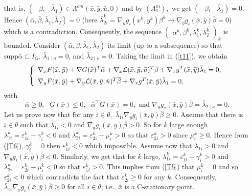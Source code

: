 	that is, $(-\beta,-\bar{\lambda}_{1})\in\Lambda^{em}(\bar{x},\bar{y},\bar
	{u},0)$ and by $(A_{1}^{m}),$ we get $(-\beta,-\bar{\lambda}
	_{1})=0.$ Hence $(\bar{\alpha},\bar{\beta},\bar{\lambda}_{1},\bar{\lambda}
	_{2})=0$ (here $\bar{\lambda}_{2i}^{k}=\nabla_{y}g_{i}(x^{k},y^{k})\beta
	^{k}\rightarrow\nabla_{y}g_{i}(\bar{x},\bar{y})\bar{\beta}=0$) which is a contradiction. 	Consequently, the sequence $
	\begin{pmatrix}
	\alpha^{k},\beta^{k},\lambda_{1}^{k},\lambda_{2}^{k}
	\end{pmatrix}
	_{k}$ is bounded. Consider $(\bar{\alpha},\overline{\beta},\bar{\lambda}
	_{1},\bar{\lambda}_{2})$ its limit (up to a subsequence) so that
$\mathrm{supp}\bar{\alpha}\subset I_{G}$, $\bar{\lambda}_{1\mid\eta
	}=0$, and $\bar{\lambda}_{2\mid\nu}=0$. 
	Taking the limit in (\ref{t11}), we obtain
	\[
	\left\{
	\begin{array}
	[c]{l}
	\nabla_{x}F(\bar{x},\bar{y})+\nabla G(\bar{x})^{T}\bar{\alpha}+\nabla
	_{x}\mathcal{L}(\bar{x},\bar{y},\bar{u})^{T}\overline{\beta}+\nabla_{x}
	g^{T}(\bar{x},\bar{y})\bar{\lambda}_{1}=0,\\[1ex]
	\nabla_{y}F(\bar{x},\bar{y})+\nabla_{y}\mathcal{L}(\bar{x},\bar{y},\bar
	{u})^{T}\overline{\beta}+\nabla_{x}g^{T}(\bar{x},\bar{y})\bar{\lambda}_{1}=0,
	\end{array}
	\right.
	\]
	with
	\[
	\bar{\alpha}\geq0,\text{ \ }G(\bar{x})\leq0,\text{  }\bar{\alpha}^{\top}
	G(\bar{x})=0, \text{ \ and  }\nabla_{y}g_{\nu}(\bar{x},\bar{y})\overline{\beta
	}=\bar{\lambda}_{2\mid\nu}=0.
	\]
	Let us prove now that for any $i\in\theta,$ $\bar{\lambda}_{1i}\nabla_{y}
	g_{i}(\bar{x},\bar{y})\overline{\beta}\geq0.$ Assume that there is $i\in
	\theta$ such that $\bar{\lambda}_{1i}<0$ and $\nabla_{y}g_{i}(\bar{x},\bar
	{y})\overline{\beta}>0.$ So for $k$ large enough  $\lambda_{1i}^{k}
	=\varepsilon_{1i}^{k}-\gamma_{i}^{k}<0$ and $\lambda_{2i}^{k}=\varepsilon
	_{2i}^{k}-\mu_{i}^{k}>0$ so that $\varepsilon_{2i}^{k}>0$ since $\mu_{i}
	^{k}\geq0.$ Hence from (\ref{T6}), $\gamma_{i}^{k}=0$ then $\varepsilon
	_{1i}^{k}<0$ which impossible. Assume now that $\bar{\lambda}_{1i}>0$ and
	$\nabla_{y}g_{i}(\bar{x},\bar{y})\overline{\beta}<0.$ Similarly, we get that
	for $k$ large, $\lambda_{1i}^{k}=\varepsilon_{1i}^{k}-\gamma_{i}^{k}>0$ and
	$\lambda_{2i}^{k}=\varepsilon_{2i}^{k}-\mu_{i}^{k}<0$ so that $\varepsilon
	_{1i}^{k}>0.$ This implies from (\ref{T5}) that $\mu_{i}^{k}=0$ and so
	$\varepsilon_{2i}^{k}<0$ which contradicts the fact that $\varepsilon_{2i}
	^{k}\geq0$ for any $k.$ Consequently,
	$\bar{\lambda}_{1i}\nabla_{y}g_{i}(\bar{x},\bar{y})\overline{\beta}\geq0$ for all $i\in\theta$; i.e., $\bar{x}$ is a C-stationary point. \\







